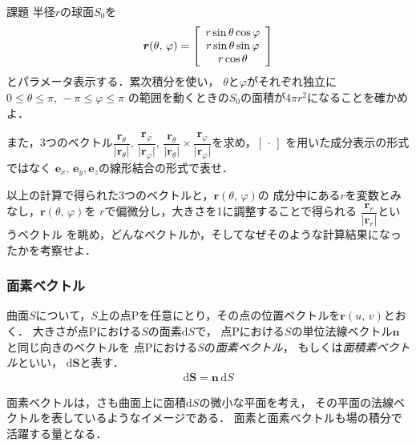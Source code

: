\begin{itembox}[l]{課題}
半径$r$の球面$S_0$を
\begin{align*}
\renewcommand{\arraystretch}{1}
\bm{r} (\theta, \, \varphi) = \left[
\begin{array}{c}
r \sin \theta \cos \varphi \\
r \sin \theta \sin \varphi \\
r \cos \theta
\end{array}
\right]
\end{align*}
とパラメータ表示する．累次積分を使い，
$\theta$と$\varphi$がそれぞれ独立に
$0 \leq \theta \leq \pi , \, - \pi \leq \varphi \leq \pi$
の範囲を動くときの$S_0$の面積が$4 \pi r^2$になることを確かめよ．

また，3つのベクトル$\dfrac{ \bm{r}_{\theta} }{\lvert \bm{r}_{\theta} \rvert } , \,
\dfrac{ \bm{r}_{\varphi} }{\lvert \bm{r}_{\varphi} \rvert}, \, 
\dfrac{ \bm{r}_{\theta} }{\lvert \bm{r}_{\theta} \rvert} 
\times \dfrac{ \bm{r}_{\varphi} }{\lvert \bm{r}_{\varphi} \rvert} $を求め，$[ \, \cdot \, ]$
を用いた成分表示の形式ではなく
$\bm{e}_x, \, \bm{e}_y , \bm{e}_z$の線形結合の形式で表せ．

以上の計算で得られた3つのベクトルと，$\bm{r}(\theta , \, \varphi)$の
成分中にある$r$を変数とみなし，$\bm{r}(\theta , \, \varphi)$を
$r$で偏微分し，大きさを1に調整することで得られる
$\dfrac{\bm{r}_r}{\lvert \bm{r}_r \rvert}$というベクトル
を眺め，どんなベクトルか，そしてなぜそのような計算結果になったかを考察せよ．
\end{itembox}

\subsubsection{面素ベクトル}
曲面$S$について，$S$上の点Pを任意にとり，その点の位置ベクトルを$\bm{r}(u, \, v)$とおく．
大きさが点Pにおける$S$の面素$\mathrm{d}S$で，
点Pにおける$S$の単位法線ベクトル$\bm{n}$と同じ向きのベクトルを
点Pにおける$S$の\emph{面素ベクトル}，
もしくは\emph{面積素ベクトル}といい，
$\mathrm{d} \bm{S}$と表す．
\begin{align}
\mathrm{d} \bm{S} = \bm{n} \, \mathrm{d}S 
\label{eq:mensovec}
\end{align}

面素ベクトルは，さも曲面上に面積$\mathrm{d}S$の微小な平面を考え，
その平面の法線ベクトルを表しているようなイメージである．
面素と面素ベクトルも場の積分で活躍する量となる．

